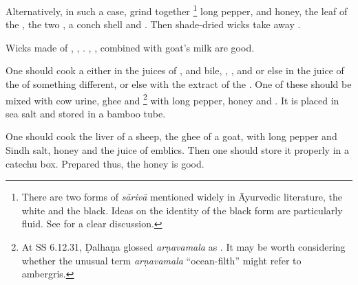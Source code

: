 \begin{translation}
    \item [17--18ab] Alternatively, in such a case, grind together
    \footnote{There are two forms of
    \emph{sārivā} mentioned widely in Āyurvedic literature, the white and the black.
    Ideas on the identity of the black form are particularly fluid.  See
    \citet[434--438]{adps} for a clear discussion.} long pepper,  and honey, the leaf of the , the two
    , a conch shell and . %
    Then shade-dried wicks take away .
    
    
    \item[18cd--19ab]
    
    Wicks made of ,
    ,
    .
    , 
    , 
    combined with goat's milk are good.
    
    \item[19cd--21ab]
    
    One should cook a  
    either in the juices of
    , and bile, , , and
     or else in the juice of the  of something
    different, or else with the extract of the . %
    One of these should be mixed with cow urine, ghee and \footnote{At SS 6.12.31, Ḍalhaṇa glossed \emph{arṇavamala} as
    . It may be worth considering whether the
    unusual term \emph{arṇavamala} “ocean-filth” might refer to ambergris.} with long
    pepper, honey and . It is placed in sea salt and stored
    in a bamboo tube.
    
    \item[21cd--22]
    
    One should cook the liver of a sheep, the ghee of a goat, with long pepper and Sindh 
    salt, honey and the juice of emblics.  Then one should store it properly in a catechu 
    box.  Prepared thus, the honey  is good. 
    
    
    \item[23]
    

\end{translation}
